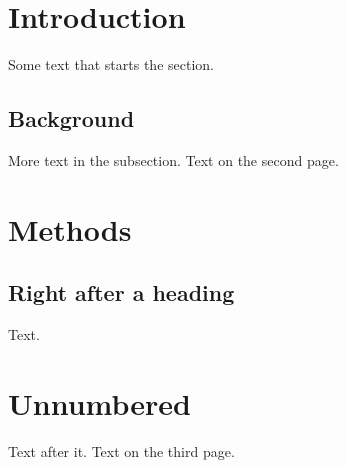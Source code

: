 \documentclass{article}
\begin{document}
\section{Introduction}
Some text that starts the section.
\subsection{Background}
More text in the subsection.
\newpage
Text on the second page.
\section{Methods}
\subsection{Right after a heading}
Text.
\section*{Unnumbered}
Text after it.
\newpage
Text on the third page.
\end{document}
